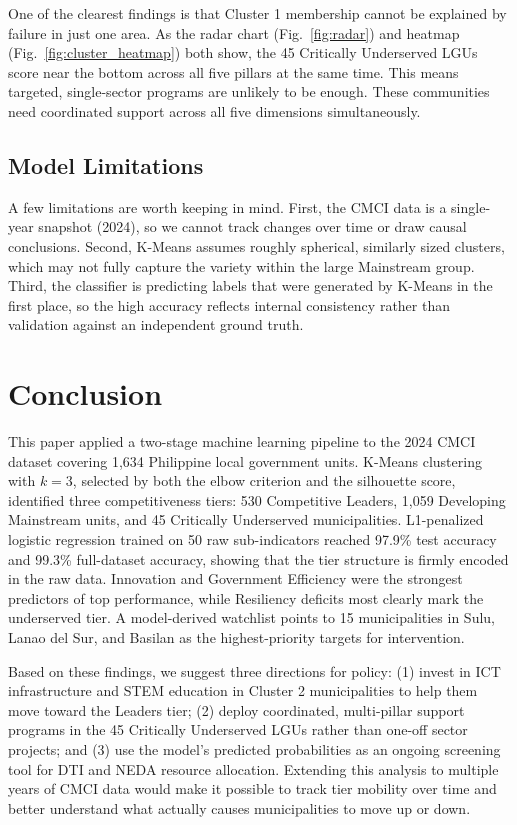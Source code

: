 \documentclass[conference]{IEEEtran}
\begin{document}
One of the clearest findings is that Cluster 1 membership cannot be explained by failure in just one area. As the radar chart (Fig.~\ref{fig:radar}) and heatmap (Fig.~\ref{fig:cluster_heatmap}) both show, the 45 Critically Underserved LGUs score near the bottom across all five pillars at the same time. This means targeted, single-sector programs are unlikely to be enough. These communities need coordinated support across all five dimensions simultaneously.

\subsection{Model Limitations}

A few limitations are worth keeping in mind. First, the CMCI data is a single-year snapshot (2024), so we cannot track changes over time or draw causal conclusions. Second, K-Means assumes roughly spherical, similarly sized clusters, which may not fully capture the variety within the large Mainstream group. Third, the classifier is predicting labels that were generated by K-Means in the first place, so the high accuracy reflects internal consistency rather than validation against an independent ground truth.

\section{Conclusion}
\label{sec:conclusion}

This paper applied a two-stage machine learning pipeline to the 2024 CMCI dataset covering 1,634 Philippine local government units. K-Means clustering with $k{=}3$, selected by both the elbow criterion and the silhouette score, identified three competitiveness tiers: 530 Competitive Leaders, 1,059 Developing Mainstream units, and 45 Critically Underserved municipalities. L1-penalized logistic regression trained on 50 raw sub-indicators reached 97.9\% test accuracy and 99.3\% full-dataset accuracy, showing that the tier structure is firmly encoded in the raw data. Innovation and Government Efficiency were the strongest predictors of top performance, while Resiliency deficits most clearly mark the underserved tier. A model-derived watchlist points to 15 municipalities in Sulu, Lanao del Sur, and Basilan as the highest-priority targets for intervention.

Based on these findings, we suggest three directions for policy: (1) invest in ICT infrastructure and STEM education in Cluster 2 municipalities to help them move toward the Leaders tier; (2) deploy coordinated, multi-pillar support programs in the 45 Critically Underserved LGUs rather than one-off sector projects; and (3) use the model's predicted probabilities as an ongoing screening tool for DTI and NEDA resource allocation. Extending this analysis to multiple years of CMCI data would make it possible to track tier mobility over time and better understand what actually causes municipalities to move up or down.
\end{document}
